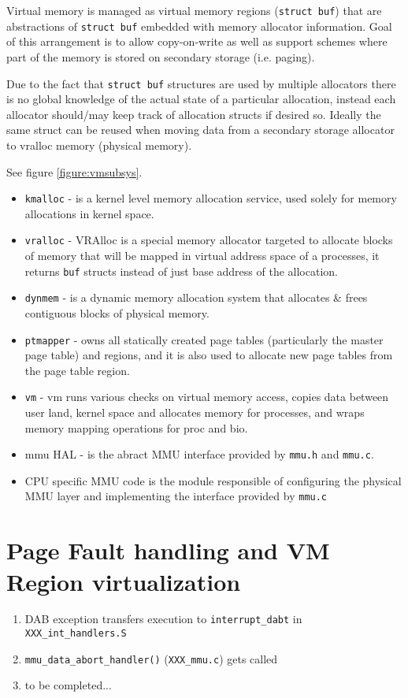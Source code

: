 Virtual memory is managed as virtual memory regions (\verb+struct buf+) that
are abstractions of \verb+struct buf+ embedded with memory allocator
information. Goal of this arrangement is to allow copy-on-write as well as
support schemes where part of the memory is stored on secondary storage
(i.e. paging).

Due to the fact that \verb+struct buf+ structures are used by multiple
allocators there is no global knowledge of the actual state of a particular
allocation, instead each allocator should/may keep track of allocation structs
if desired so. Ideally the same struct can be reused when moving data from a
secondary storage allocator to vralloc memory (physical memory).


See figure \ref{figure:vmsubsys}.

\begin{itemize}
  \item \verb+kmalloc+  - is a kernel level memory allocation service, used
                        solely for memory allocations in kernel space.
  \item \verb+vralloc+  - VRAlloc is a special memory allocator targeted to
                        allocate blocks of memory that will be mapped in virtual
                        address space of a processes, it returns
                        \verb+buf+ structs instead of just base address of
                        the allocation.
  \item \verb+dynmem+   - is a dynamic memory allocation system that allocates
                        \& frees contiguous blocks of physical memory.
  \item \verb+ptmapper+ - owns all statically created page tables (particularly
                        the master page table) and regions, and it is also used
                        to allocate new page tables from the page table region.
  \item \verb+vm+       - vm runs various checks on virtual memory access,
                        copies data between user land, kernel space and
                        allocates memory for processes, and wraps memory mapping
                        operations for proc and \acs{bio}.
  \item mmu HAL -       is the abract MMU interface provided by \verb+mmu.h+
                        and \verb+mmu.c+.
  \item CPU specific MMU code is the module responsible of configuring the
        physical MMU layer and implementing the interface provided by
        \verb+mmu.c+
\end{itemize}


\section{Page Fault handling and VM Region virtualization}

\begin{enumerate}
\item DAB exception transfers execution to \verb+interrupt_dabt+ in \verb+XXX_int_handlers.S+
\item \verb+mmu_data_abort_handler()+ (\verb+XXX_mmu.c+) gets called
\item to be completed...
\end{enumerate}
